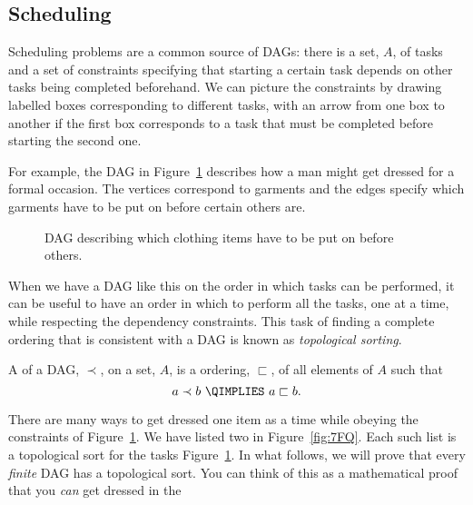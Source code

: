 \subsection{Scheduling}\label{sched_subsec}

Scheduling problems are a common source of DAGs: there is a set,
$A$, of tasks and a set of constraints specifying that starting a certain
task depends on other tasks being completed beforehand.  We can picture
the constraints by drawing labelled boxes corresponding to different
tasks, with an arrow from one box to another if the first box corresponds
to a task that must be completed before starting the second one.

For example, the DAG in Figure~\ref{fig:7FP} describes how a man
might get dressed for a formal occasion.  The vertices correspond to
garments and the edges specify which garments have to be put on before
certain others are. 

\begin{figure}


\caption{DAG describing which clothing items have to be put on before others.}

\label{fig:7FP}

\end{figure}

When we have a DAG like this on the order in which tasks can be
performed, it can be useful to have an order in which to perform all
the tasks, one at a time, while respecting the dependency constraints.
This task of finding a complete ordering that is consistent with a DAG
is known as \emph{topological sorting}.

\begin{editingnotes}

\begin{definition}
  A  of a DAG, $\prec$, on a set, $A$, is
  a ordering, $\sqsubset$, of all elements of $A$ such that
\[
a \prec b\ \QIMPLIES\  a \sqsubset b.
\]
\end{definition}

\end{editingnotes}

There are many ways to get dressed one item as a time while obeying
the constraints of Figure~\ref{fig:7FP}.  We have listed two in
Figure~\ref{fig:7FQ}.  Each such list is a topological sort for the
tasks Figure~\ref{fig:7FP}.  In what follows, we will prove
that every \emph{finite} DAG has a topological sort.  You
can think of this as a mathematical proof that you \emph{can} get
dressed in the 

